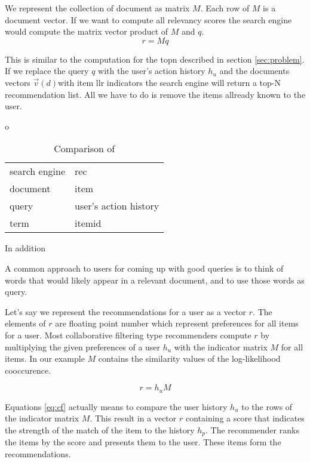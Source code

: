 We represent the collection of document as matrix $M$. Each row of $M$ is a document vector. If we want to compute all relevancy scores the search engine would compute the matrix vector product of $M$ and $q$.
\begin{equation}
  \label{eq:ser}
  r = M q
\end{equation}

This is similar to the computation for the \gls{topn} described in section \ref{sec:problem}. If we replace the query $q$ with the user's action history $h_u$ and the documents vectors  $\vec{v}(d)$with item \gls{llr} indicators the search engine will return a top-N recommendation list. All we have to do is remove the items allready known to the user.

o

\begin{table}
\begin{center}
\begin{tabular}{ll}
 search engine & \gls{rec}\\
 document & item\\
 query & user's action history \\
term & itemid \\
\end{tabular}
\end{center}
\caption{Comparison of }
\label{tbl:llr}
\end{table}

In addition 

A common approach to users for coming up with good queries is to think of words that would likely appear in a relevant document, and to use those words as query.

Let's say we represent the recommendations for a user as a vector $r$. The elements of $r$ are floating point number which represent preferences for all items for a user. Most collaborative filtering type recommenders compute $r$ by multiplying the given preferences of a user $h_u$ with the indicator matrix $M$ for all items. In our example $M$ contains the similarity values of the log-likelihood cooccurence.

\begin{equation}
  \label{eq:cf}
  r = h_u M
\end{equation}

Equations \ref{eq:cf} actually means to compare the user history $h_u$ to the rows of the indicator matrix $M$. This result in a vector $r$ containing a score that indicates the strength of the match of the item to the history $h_p$. The recommender ranks the items by the score and presents them to the user. These items form the recommendations.

